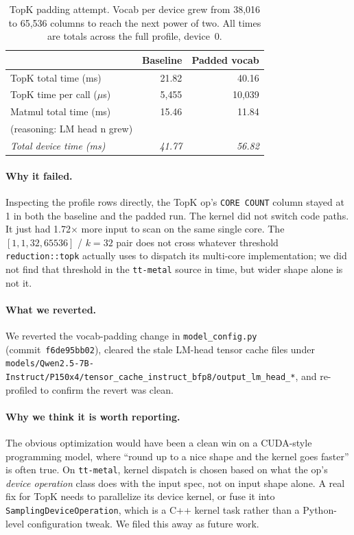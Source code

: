\documentclass[sigplan,nonacm]{acmart}
\newcommand{\code}[1]{\texttt{\nolinkurl{#1}}}
\begin{document}
\begin{table}[h]
\centering
\small
\caption{TopK padding attempt. Vocab per device grew from 38{,}016 to
65{,}536 columns to reach the next power of two. All times are
totals across the full profile, device~0.}
\label{tab:topk}
\begin{tabular}{lrr}
\toprule
 & Baseline & Padded vocab \\
\midrule
TopK total time (ms)       & 21.82 & 40.16 \\
TopK time per call ($\mu$s) & 5{,}455 & 10{,}039 \\
Matmul total time (ms)     & 15.46 & 11.84 \\
(reasoning: LM head n grew) &       &       \\
\emph{Total device time (ms)} & \emph{41.77} & \emph{56.82} \\
\bottomrule
\end{tabular}
\end{table}

\paragraph{Why it failed.} Inspecting the profile rows directly, the
TopK op's \texttt{CORE COUNT} column stayed at 1 in both the baseline
and the padded run. The kernel did not switch code paths. It just
had 1.72$\times$ more input to scan on the same single core. The
$[1,1,32,65536]$ / $k{=}32$ pair does not cross whatever threshold
\texttt{reduction::topk} actually uses to dispatch its multi-core
implementation; we did not find that threshold in the \texttt{tt-metal}
source in time, but wider shape alone is not it.

\paragraph{What we reverted.} We reverted the vocab-padding change in
\texttt{model\_config.py} (commit~\texttt{f6de95bb02}), cleared the
stale LM-head tensor cache files under
\code{models/Qwen2.5-7B-Instruct/P150x4/tensor_cache_instruct_bfp8/output_lm_head_*},
and re-profiled to confirm the revert was clean.

\paragraph{Why we think it is worth reporting.} The obvious
optimization would have been a clean win on a CUDA-style
programming model, where ``round up to a nice shape and the kernel
goes faster'' is often true. On \texttt{tt-metal}, kernel dispatch is
chosen based on what the op's \emph{device operation} class does with
the input spec, not on input shape alone. A real fix for TopK needs
to parallelize its device kernel, or fuse it into
\texttt{SamplingDeviceOperation}, which is a C++ kernel task rather
than a Python-level configuration tweak. We filed this away as future
work.
\end{document}
